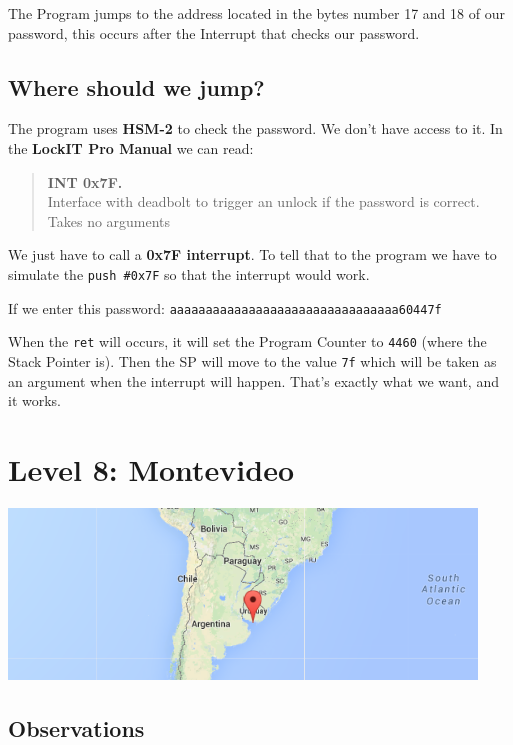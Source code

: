 The Program jumps to the address located in the bytes number 17 and 18
of our password, this occurs after the Interrupt that checks our
password.

\subsection{Where should we jump?}\label{where-should-we-jump}

The program uses \textbf{HSM-2} to check the password. We don't have
access to it. In the \textbf{LockIT Pro Manual} we can read:

\begin{quote}
\textbf{INT 0x7F.}\\Interface with deadbolt to trigger an unlock if the
password is correct.\\Takes no arguments
\end{quote}

We just have to call a \textbf{0x7F interrupt}. To tell that to the
program we have to simulate the \texttt{push \#0x7F} so that the
interrupt would work.

If we enter this password:
\texttt{aaaaaaaaaaaaaaaaaaaaaaaaaaaaaaaa60447f}

When the \texttt{ret} will occurs, it will set the Program Counter to
\texttt{4460} (where the Stack Pointer is). Then the SP will move to the
value \texttt{7f} which will be taken as an argument when the interrupt
will happen. That's exactly what we want, and it works.

\section{Level 8: Montevideo}\label{level-8-montevideo}

\includegraphics{img/8_1.PNG}

\subsection{Observations}\label{observations-4}

